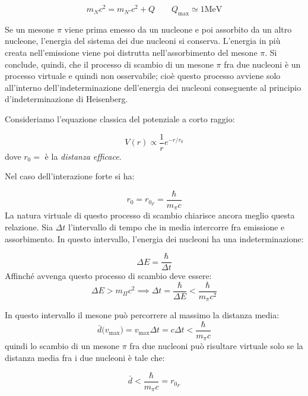 \begin{equation*} 
  m_N c^2 = m_{N'} c^2 + Q \qquad Q_\text{max} \simeq 1 \text{MeV}
\end{equation*}

Se un mesone $\pi$ viene prima emesso da un nucleone e poi assorbito da un altro
nucleone, l'energia del sistema dei due nucleoni si conserva. L'energia in più
creata nell'emissione viene poi distrutta nell'assorbimento del mesone $\pi$. Si
conclude, quindi, che il processo di scambio di un mesone $\pi$ fra due nucleoni
è un processo virtuale e quindi non osservabile; cioè questo processo avviene
solo all'interno dell'indeterminazione dell'energia dei nucleoni conseguente al
principio d'indeterminazione di Heisenberg.

Consideriamo l'equazione classica del potenziale a corto raggio:

\begin{equation*}
V(r) \propto \dfrac{1}{r} e^{-r/r_0}
\end{equation*}
dove $r_0 =$ è la \textit{distanza efficace}.

Nel caso dell'interazione forte si ha:

\begin{equation*}
r_0 = r_{0_{F}} = \dfrac{\hbar}{m_{\pi} c}
\end{equation*}
La natura virtuale di questo processo di scambio chiarisce ancora meglio questa relazione. 
Sia $\Delta t$ l'intervallo di tempo che in media intercorre fra emissione e
assorbimento. In questo intervallo, l'energia dei nucleoni ha una
indeterminazione:

\begin{equation*}
\Delta E = \dfrac{\hbar}{\Delta t}
\end{equation*}
Affinché avvenga questo processo di scambio deve essere:
\begin{equation*}
\Delta E > m_{\Pi} c^2  \implies \Delta t = \dfrac{\hbar}{\Delta E} < \dfrac{\hbar}{m_{\pi}c^2}
\end{equation*}

In questo intervallo il mesone può percorrere al massimo la distanza media:
\begin{equation*}
\bar{d} \bigl(v_\text{max} \bigr) = v_\text{max} \Delta t = c \Delta t < \dfrac{\hbar}{m_{\pi}c}
\end{equation*}
quindi lo scambio di un mesone $\pi$ fra due nucleoni può risultare virtuale
solo se la distanza media fra i due nucleoni è tale che:

\begin{equation*}
\bar{d} < \dfrac{\hbar}{m_{\pi}c} = r_{0_{F}}
\end{equation*}

